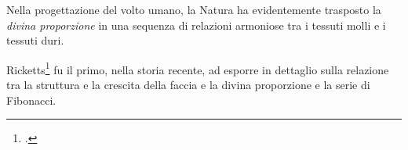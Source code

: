 Nella progettazione del volto umano, la Natura ha evidentemente trasposto la \textit{divina proporzione} in una sequenza di relazioni armoniose tra i tessuti molli e i tessuti duri. %

Ricketts\footcite{Ricketts1982,Ricketts1982a} fu il primo, nella storia recente, ad esporre in dettaglio sulla relazione tra la struttura e la crescita della faccia e la divina proporzione e la serie di Fibonacci.
